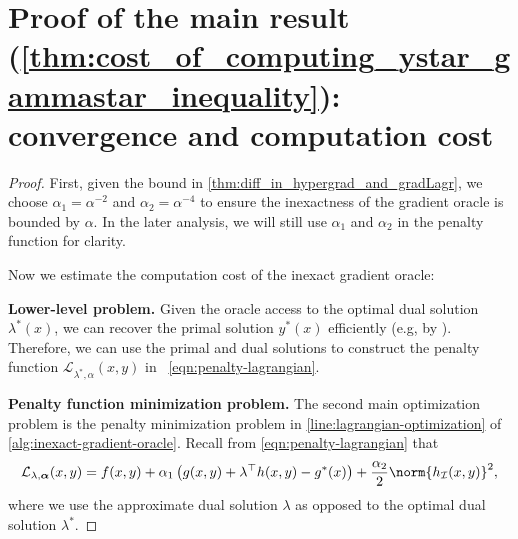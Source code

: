 \section{Proof of the main result (\cref{thm:cost_of_computing_ystar_gammastar_inequality}): convergence and computation cost}\label{appendix:cost_of_computing_ystar_gammastar_inequality}
\computationCostInequality*
\begin{proof}
    First, given the bound in \cref{thm:diff_in_hypergrad_and_gradLagr}, we choose $\alpha_1 = \alpha^{-2}$ and $\alpha_2 = \alpha^{-4}$ to ensure the inexactness of the gradient oracle is bounded by $\alpha$. In the later analysis, we will still use $\alpha_1$ and $\alpha_2$ in the penalty function for clarity.

    Now we estimate the computation cost of the inexact gradient oracle:
    
    \noindent\textbf{Lower-level problem.}
    Given the oracle access to the optimal dual solution $\lambda^*(x)$, we can recover the primal solution $y^*(x)$ efficiently (e.g, by \cite{zhang2022solving}). Therefore, we can use the primal and dual solutions to construct the penalty function $\mathcal{L}_{\lambda^*, \alpha}(x,y)$ in ~\cref{eqn:penalty-lagrangian}.
    
    \noindent\textbf{Penalty function minimization problem.}
    The second main optimization problem is the penalty minimization problem in \cref{line:lagrangian-optimization} of \cref{alg:inexact-gradient-oracle}.
    Recall from \cref{eqn:penalty-lagrangian} that 
    \begin{align}\label{eqn:penalty-lagrangian-approximate}
        \mathcal{L}_{\lambda,\boldsymbol{\alpha}}(x,y) = f(x,y) + \alpha_1 \left( g(x,y) + \lambda^\top h(x,y) - g^*(x)  \right) + \frac{\alpha_2}{2} \norm{h_\mathcal{I}(x,y)}^2, 
    \end{align}
    where we use the approximate dual solution $\lambda$ as opposed to the optimal dual solution $\lambda^*$.


\end{proof}
